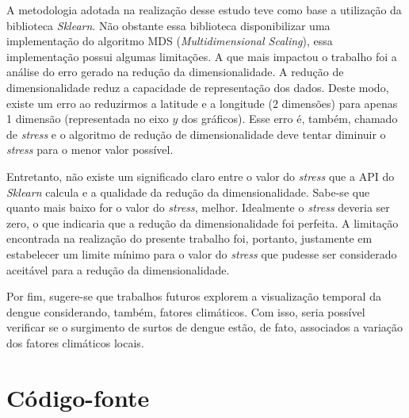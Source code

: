 \documentclass[12pt,openright,twoside,a4paper,article,brazil]{abntex2}
\begin{document}
A metodologia adotada na realização desse estudo teve como base a utilização da biblioteca \emph{Sklearn}\cite{sklearn-mds}. Não obstante essa biblioteca disponibilizar uma implementação do algoritmo MDS (\emph{Multidimensional Scaling}), essa implementação possui algumas limitações. A que mais impactou o trabalho foi a análise do erro gerado na redução da dimensionalidade. A redução de dimensionalidade reduz a capacidade de representação dos dados\cite{multidimensional-scaling-book}. Deste modo, existe um erro ao reduzirmos a latitude e a longitude (2 dimensões) para apenas 1 dimensão (representada no eixo $y$ dos gráficos). Esse erro é, também, chamado de \emph{stress} e o algoritmo de redução de dimensionalidade deve tentar diminuir o \emph{stress} para o menor valor possível.

Entretanto, não existe um significado claro entre o valor do \emph{stress} que a API do \emph{Sklearn} calcula e a qualidade da redução da dimensionalidade. Sabe-se que quanto mais baixo for o valor do \emph{stress}, melhor. Idealmente o \emph{stress} deveria ser zero, o que indicaria que a redução da dimensionalidade foi perfeita. A limitação encontrada na realização do presente trabalho foi, portanto, justamente em estabelecer um limite mínimo para o valor do \emph{stress} que pudesse ser considerado aceitável para a redução da dimensionalidade.

Por fim, sugere-se que trabalhos futuros explorem a visualização temporal da dengue considerando, também, fatores climáticos. Com isso, seria possível verificar se o surgimento de surtos de dengue estão, de fato, associados a variação dos fatores climáticos locais.


\backmatter

\postextual

\newpage



\apendices


\chapter{Código-fonte}
\label{sec:ap-codigo-mds}

\lstset{breaklines=true,numbers=left,extendedchars=true}



\end{document}
